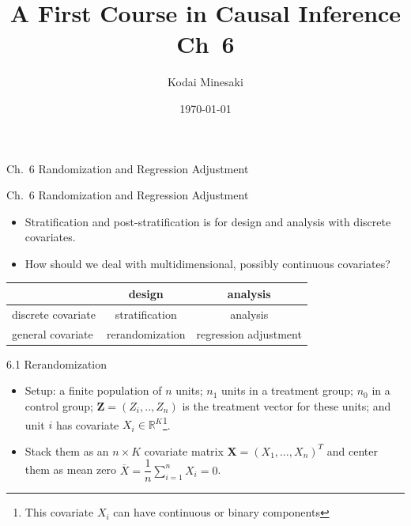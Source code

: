 \documentclass[aspectratio=169, 12pt]{beamer}
\title[]{A First Course in Causal Inference Ch~6}
\author[Kodai Minesaki]{Kodai Minesaki}
\institute[Faculty of Engineering, The University of Tokyo]{Faculty of Engineering, The University of Tokyo}
\date{\today}
\begin{document}
\begin{frame}
\titlepage
\end{frame}


\begin{frame}

  {
    \large
    Ch.~6 Randomization and Regression Adjustment
  }
  
\end{frame}

\begin{frame}{Ch.~6 Randomization and Regression Adjustment}
  \begin{itemize}
    \item Stratification and post-stratification is for design and analysis with discrete covariates.
    \item How should we deal with multidimensional, possibly continuous covariates?
  \end{itemize}
  \begin{table}
    \centering
    \begin{tabular}{lcc}
      \toprule
      & design & analysis \\
      \midrule
      discrete covariate & stratification & analysis \\
      general covariate & rerandomization & regression adjustment\\
      \bottomrule
    \end{tabular}
  \end{table}
\end{frame}

\begin{frame}{6.1 Rerandomization}
  \begin{itemize}
    \item Setup: a finite population of $n$ units; $n_1$ units in a treatment group; $n_0$ in a control group; $\bm{Z}=(Z_i,..,Z_n)$ is the treatment vector for these units; and unit $i$ has covariate $X_i\in \mathbb{R}^{K}$\footnote{This covariate $X_i$ can have continuous or binary components}.
    \item Stack them as an $n\times K$ covariate matrix $\bm{X}=(X_1, \dots,X_n)^{T}$ and center them as mean zero $\overline{X}=\dfrac{1}{n}\sum_{i=1}^{n}X_i=0$.
  \end{itemize}
\end{frame}
\end{document}

